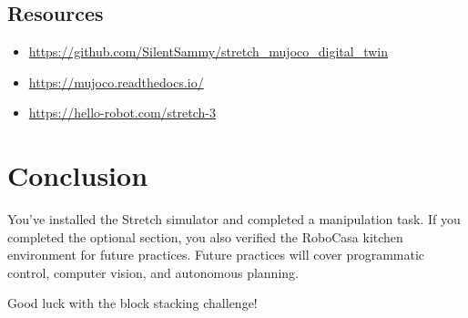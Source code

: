 \documentclass[11pt,a4paper]{article}
\begin{document}
\subsection{Resources}

\begin{itemize}
    \item \url{https://github.com/SilentSammy/stretch_mujoco_digital_twin}
    \item \url{https://mujoco.readthedocs.io/}
    \item \url{https://hello-robot.com/stretch-3}
\end{itemize}

\section{Conclusion}

You've installed the Stretch simulator and completed a manipulation task. If you completed the optional section, you also verified the RoboCasa kitchen environment for future practices. Future practices will cover programmatic control, computer vision, and autonomous planning.

Good luck with the block stacking challenge!
\end{document}
